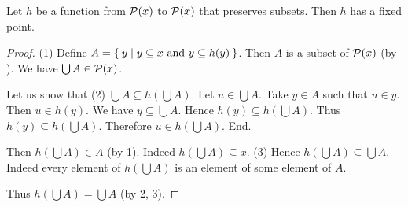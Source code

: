 \documentclass[../../set-theory.ftl.tex]{subfiles}
\begin{document}
  \begin{forthel}
    \begin{theorem}\label{SetTheory_02_05_636019}
      Let $h$ be a function from $\mathcal{P}(x)$ to $\mathcal{P}(x)$ that preserves subsets.
      Then $h$ has a fixed point.
    \end{theorem}
    \begin{proof}
      (1) Define $A = \Set{y | \text{$y \subseteq x$ and $y \subseteq h(y)$}}$.
      Then $A$ is a subset of $\mathcal{P}(x)$ (by ).
      We have $\bigcup A \in \mathcal{P}(x)$.

      Let us show that (2) $\bigcup A \subseteq h(\bigcup A)$.
        Let $u \in \bigcup A$.
        Take $y \in A$ such that $u \in y$.
        Then $u \in h(y)$.
        We have $y \subseteq \bigcup A$.
        Hence $h(y) \subseteq h(\bigcup A)$.
        Thus $h(y) \subseteq h(\bigcup A)$.
        Therefore $u \in h(\bigcup A)$.
      End.

      Then $h(\bigcup A) \in A$ (by 1).
      Indeed $h(\bigcup A) \subseteq x$.
      (3) Hence $h(\bigcup A) \subseteq \bigcup A$.
      Indeed every element of $h(\bigcup A)$ is an element of some element of $A$.

      Thus $h(\bigcup A) = \bigcup A$ (by 2, 3).
    \end{proof}
  \end{forthel}
\end{document}
